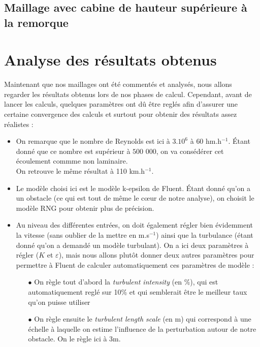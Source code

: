\subsection{Maillage avec cabine de hauteur supérieure à la remorque}

\section{Analyse des résultats obtenus}
Maintenant que nos maillages ont été commentés et analysés, nous allons regarder les résultats obtenus lors de nos phases de calcul. Cependant, avant de lancer les calculs, quelques paramètres ont dû être reglés afin d'assurer une certaine convergence des calculs et surtout pour obtenir des résultats assez réalistes :
\begin{itemize}
	\item On remarque que le nombre de Reynolds est ici à $3.10^6$ à $60$ hm.h$^{-1}$. Étant donné que ce nombre est supérieur à $500$ $000$, on va consédérer cet écoulement commme non laminaire. \\%
On retrouve le même résultat à 110 km.h$^{-1}$. 
	\item Le modèle choisi ici est le modèle k-epsilon de Fluent. %
Étant donné qu'on a un obstacle (ce qui est tout de même le c\oe ur de notre analyse), on choisit le modèle RNG pour obtenir plus de précision.
	\item Au niveau des différentes entrées, on doit également régler bien évidemment la vitesse (sans oublier de la mettre en m.s$^{-1}$) ainsi que la turbulance (étant donné qu'on a demandé un modèle turbulant). On a ici deux paramètres à régler ($K$ et $\varepsilon$), mais nous allons plutôt donner deux autres paramètres pour permettre à Fluent de calculer automatiquement ces paramètres de modèle :
	\begin{itemize}
		\item[$\bullet$] On règle tout d'abord la \textit{turbulent intensity} (en \%), qui est automatiquement reglé sur 10\% et qui semblerait être le meilleur taux qu'on puisse utiliser
		\item[$\bullet$] On règle ensuite le \textit{turbulent length scale} (en m) qui correspond à une échelle à laquelle on estime l'influence de la perturbation autour de notre obstacle. %
On le règle ici à 3m.
	\end{itemize}
\end{itemize}

